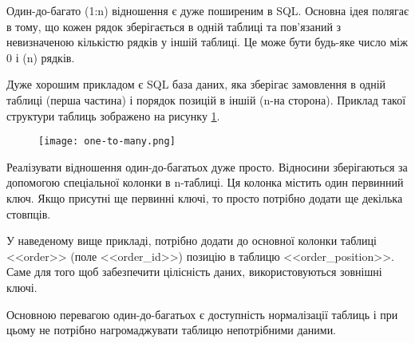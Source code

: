 \par Один-до-багато (1:n) відношення є дуже поширеним в SQL. Основна ідея полягає в тому, що кожен рядок зберігається в одній таблиці та пов'язаний з невизначеною кількістю рядків у іншій таблиці. Це може бути будь-яке число між 0 і (n) рядків.
\par Дуже хорошим прикладом є SQL база даних, яка зберігає замовлення в одній таблиці (перша частина) і порядок позицій в іншій (n-на сторона). Приклад такої структури таблиць зображено на рисунку \ref{pic:one_to_many.png}.
\begin{figure}[!ht]
\centering
		\texttt{[image: one-to-many.png]}
		\vspace{18pt}
		\label{pic:one_to_many.png}
\end{figure}
\par Реалізувати відношення один-до-багатьох дуже просто. Відносини зберігаються за допомогою спеціальної колонки в n-таблиці. Ця колонка містить один первинний ключ. Якщо присутні ще первинні ключі, то просто потрібно додати ще декілька стовпців.

\par У наведеному вище прикладі, потрібно додати до основної колонки таблиці <<order>> (поле <<order\_id>>) позицію в таблицю <<order\_position>>. Саме для того щоб забезпечити цілісність даних, використовуються зовнішні ключі.
\par Основною перевагою один-до-багатьох є доступність нормалізації таблиць і при цьому не потрібно нагромаджувати таблицю непотрібними даними.


